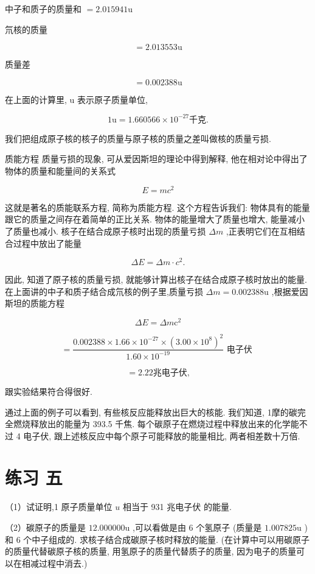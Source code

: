 \documentclass[10pt]{article}
\begin{document}
中子和质子的质量和 \(= {2.015941}\mathrm{u}\)

氘核的质量

\[
= {2.013553}\mathrm{u}
\]

质量差

\[
= {0.002388}\mathrm{u}
\]

在上面的计算里, \(\mathrm{u}\) 表示原子质量单位,

\[
1\mathrm{u} = {1.660566} \times {10}^{-{27}}\text{千克.}
\]

我们把组成原子核的核子的质量与原子核的质量之差叫做核的质量亏损.

质能方程 质量亏损的现象, 可从爱因斯坦的理论中得到解释, 他在相对论中得出了物体的质量和能量间的关系式

\[
E = m{c}^{2}
\]

这就是著名的质能联系方程, 简称为质能方程. 这个方程告诉我们: 物体具有的能量跟它的质量之间存在着简单的正比关系. 物体的能量增大了质量也增大, 能量减小了质量也减小. 核子在结合成原子核时出现的质量亏损 \({\Delta m}\) ,正表明它们在互相结合过程中放出了能量

\[
{\Delta E} = {\Delta m} \cdot {c}^{2}.
\]

因此, 知道了原子核的质量亏损, 就能够计算出核子在结合成原子核时放出的能量. 在上面讲的中子和质子结合成氘核的例子里,质量亏损 \({\Delta m} = {0.002388}\mathrm{u}\) ,根据爱因斯坦的质能方程

\[
{\Delta E} = {\Delta m}{\mathrm{c}}^{2}
\]

\[
= \frac{{0.002388} \times {1.66} \times {10}^{-{27}} \times {\left( {3.00} \times {10}^{8}\right) }^{2}}{{1.60} \times {10}^{-{19}}}\text{ 电子伏 }
\]

\[
= {2.22}\text{兆电子伏,}
\]

跟实验结果符合得很好.

通过上面的例子可以看到, 有些核反应能释放出巨大的核能. 我们知道, 1摩的碳完全燃烧释放出的能量为 393.5 千焦. 每个碳原子在燃烧过程中释放出来的化学能不过 4 电子伏, 跟上述核反应中每个原子可能释放的能量相比, 两者相差数十万倍.

\section*{练习 五}

（1）试证明,1 原子质量单位 \(u\) 相当于 931 兆电子伏 的能量.

（2）碳原子的质量是 \({12.000000}\mathrm{u}\) ,可以看做是由 6 个氢原子 (质量是 \({1.007825}\mathrm{u}\) ) 和 6 个中子组成的. 求核子结合成碳原子核时释放的能量. (在计算中可以用碳原子的质量代替碳原子核的质量, 用氢原子的质量代替质子的质量, 因为电子的质量可以在相减过程中消去.)
\end{document}
